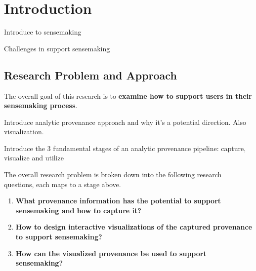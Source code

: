 \chapter{Introduction}

\graphicspath{{Chapter1/figures/}}


Introduce to sensemaking

Challenges in support sensemaking


\section{Research Problem and Approach}
The overall goal of this research is to \textbf{examine how to support users in their sensemaking process}.

Introduce analytic provenance approach and why it's a potential direction. Also visualization.
 
Introduce the 3 fundamental stages of an analytic provenance pipeline: capture, visualize and utilize

The overall research problem is broken down into the following research questions, each maps to a stage above. 
\begin{enumerate}
	\item \textbf{What provenance information has the potential to support sensemaking and how to capture it?} 
	\item \textbf{How to design interactive visualizations of the captured provenance to support sensemaking?}
	\item \textbf{How can the visualized provenance be used to support sensemaking?} 
\end{enumerate}

